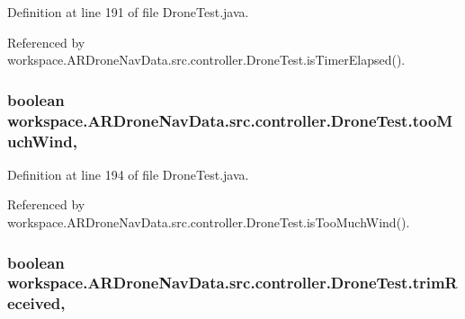 Definition at line 191 of file Drone\+Test.\+java.



Referenced by workspace.\+A\+R\+Drone\+Nav\+Data.\+src.\+controller.\+Drone\+Test.\+is\+Timer\+Elapsed().

\hypertarget{classworkspace_1_1_a_r_drone_nav_data_1_1src_1_1controller_1_1_drone_test_a2e3e5e1fcaf3aada3e0dcc874d00d56a}{}
\subsubsection[{too\+Much\+Wind}]{\setlength{\rightskip}{0pt plus 5cm}boolean workspace.\+A\+R\+Drone\+Nav\+Data.\+src.\+controller.\+Drone\+Test.\+too\+Much\+Wind\hspace{0.3cm}{\ttfamily [static]}, {\ttfamily [protected]}}\label{classworkspace_1_1_a_r_drone_nav_data_1_1src_1_1controller_1_1_drone_test_a2e3e5e1fcaf3aada3e0dcc874d00d56a}


Definition at line 194 of file Drone\+Test.\+java.



Referenced by workspace.\+A\+R\+Drone\+Nav\+Data.\+src.\+controller.\+Drone\+Test.\+is\+Too\+Much\+Wind().

\hypertarget{classworkspace_1_1_a_r_drone_nav_data_1_1src_1_1controller_1_1_drone_test_a3a00dcc76d693e172c428a2eafa81ecd}{}
\subsubsection[{trim\+Received}]{\setlength{\rightskip}{0pt plus 5cm}boolean workspace.\+A\+R\+Drone\+Nav\+Data.\+src.\+controller.\+Drone\+Test.\+trim\+Received\hspace{0.3cm}{\ttfamily [static]}, {\ttfamily [protected]}}\label{classworkspace_1_1_a_r_drone_nav_data_1_1src_1_1controller_1_1_drone_test_a3a00dcc76d693e172c428a2eafa81ecd}


